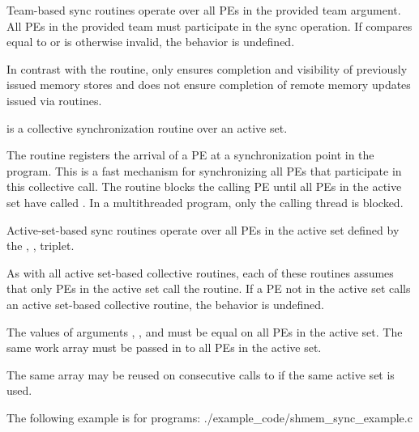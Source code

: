 \begin{apidefinition}
{    Team-based sync routines operate over all \acp{PE} in the provided team argument. All
    \acp{PE} in the provided team must participate in the sync operation.
    If  compares equal to  or is
    otherwise invalid, the behavior is undefined.

    In contrast with the  routine,  only
    ensures completion and visibility of previously issued memory stores and does not ensure
    completion of remote memory updates issued via \openshmem routines.

\begin{DeprecateBlock}
     is a collective synchronization routine over an active set.

    The routine registers the arrival of a \ac{PE} at a synchronization point in the program.
    This is a fast mechanism for synchronizing all \acp{PE} that participate in this
    collective call. The routine blocks the calling \ac{PE} until all \acp{PE} in the
    active set have called . In a multithreaded \openshmem
    program, only the calling thread is blocked.

    Active-set-based sync routines operate over all \acp{PE} in the active set
    defined by the , ,  triplet.

    As with all active set-based collective routines,
    each of these routines assumes
    that only \acp{PE} in the active set call the routine.  If a \ac{PE} not in
    the active set calls an active set-based collective routine,
    the behavior is undefined.

    The values of arguments , , and
     must be equal on all \acp{PE} in the active set.  The same
    work array must be passed in  to all \acp{PE} in the active set.

    The same  array may be reused on consecutive calls to
     if the same active set is used.
\end{DeprecateBlock}


}



\begin{apiexamples}

\apicexample
    {The following  example is
    for \Cstd[11] programs:}
    {./example_code/shmem_sync_example.c}
    {}

\end{apiexamples}

\end{apidefinition}
